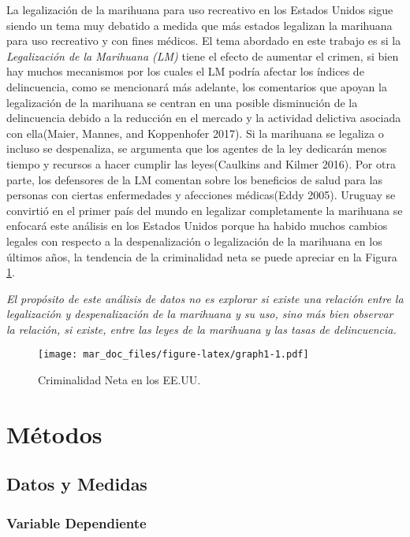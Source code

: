 \documentclass[11pt,]{article}
\begin{document}
La legalización de la marihuana para uso recreativo en los Estados
Unidos sigue siendo un tema muy debatido a medida que más estados
legalizan la marihuana para uso recreativo y con fines médicos. El tema
abordado en este trabajo es si la \emph{Legalización de la Marihuana
(LM)} tiene el efecto de aumentar el crimen, si bien hay muchos
mecanismos por los cuales el LM podría afectar los índices de
delincuencia, como se mencionará más adelante, los comentarios que
apoyan la legalización de la marihuana se centran en una posible
disminución de la delincuencia debido a la reducción en el mercado y la
actividad delictiva asociada con ella(Maier, Mannes, and Koppenhofer
2017). Si la marihuana se legaliza o incluso se despenaliza, se
argumenta que los agentes de la ley dedicarán menos tiempo y recursos a
hacer cumplir las leyes(Caulkins and Kilmer 2016). Por otra parte, los
defensores de la LM comentan sobre los beneficios de salud para las
personas con ciertas enfermedades y afecciones médicas(Eddy 2005).
Uruguay se convirtió en el primer país del mundo en legalizar
completamente la marihuana se enfocará este análisis en los Estados
Unidos porque ha habido muchos cambios legales con respecto a la
despenalización o legalización de la marihuana en los últimos años, la
tendencia de la criminalidad neta se puede apreciar en la Figura
\ref{fig:plot1}.

\emph{El propósito de este análisis de datos no es explorar si existe
una relación entre la legalización y despenalización de la marihuana y
su uso, sino más bien observar la relación, si existe, entre las leyes
de la marihuana y las tasas de delincuencia.}

\begin{figure}
\centering
\texttt{[image: mar\_doc\_files/figure-latex/graph1-1.pdf]}
\caption{\label{fig:plot1} Criminalidad Neta en los EE.UU.}
\end{figure}

\hypertarget{metodos}{%
\section{Métodos}\label{metodos}}

\hypertarget{datos-y-medidas}{%
\subsection{Datos y Medidas}\label{datos-y-medidas}}

\hypertarget{variable-dependiente}{%
\subsubsection{Variable Dependiente}\label{variable-dependiente}}
\end{document}
